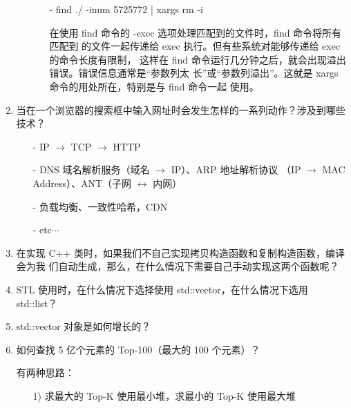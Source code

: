 \begin{enumerate}
\begin{enumerate}
\begin{itemize}
    \item [-] find ./ -inum 5725772 | xargs rm -i

      在使用 find 命令的 -exec 选项处理匹配到的文件时，find 命令将所有匹配到
      的文件一起传递给 exec 执行。但有些系统对能够传递给 exec 的命令长度有限制，
      这样在 find 命令运行几分钟之后，就会出现溢出错误。错误信息通常是“参数列太
      长”或“参数列溢出”。这就是 xargs 命令的用处所在，特别是与 find 命令一起
      使用。
    \end{itemize}
  \end{enumerate}

  
\item 当在一个浏览器的搜索框中输入网址时会发生怎样的一系列动作？涉及到哪些技术？

  \begin{itemize}
  \item [-] IP $\rightarrow$ TCP $\rightarrow$ HTTP
  \item [-] DNS 域名解析服务（域名 $\rightarrow$ IP）、ARP 地址解析协议
    （IP $\rightarrow$ MAC Address）、ANT（子网 $\leftrightarrow$ 内网）
  \item [-] 负载均衡、一致性哈希，CDN
  \item [-] etc$\cdots$
  \end{itemize}
  
\item 在实现 C++ 类时，如果我们不自己实现拷贝构造函数和复制构造函数，编译会为我
  们自动生成，那么，在什么情况下需要自己手动实现这两个函数呢？ %
\item STL 使用时，在什么情况下选择使用 std::vector，在什么情况下选用
  std::list？%
\item std::vector 对象是如何增长的？ %
\item 如何查找 5 亿个元素的 Top-100（最大的 100 个元素）？

  有两种思路：

  \begin{itemize}
  \item [1)] 求最大的 Top-K 使用最小堆，求最小的 Top-K 使用最大堆


\end{itemize}
\end{enumerate}
